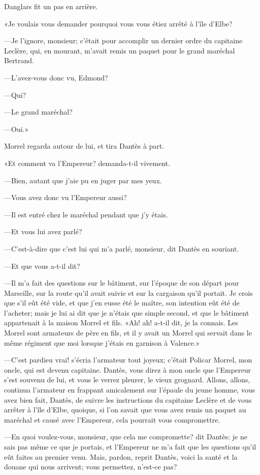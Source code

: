 Danglars fit un pas en arrière.

«Je voulais vous demander pourquoi vous vous étiez arrêté à l'île d'Elbe?

—Je l'ignore, monsieur; c'était pour accomplir un dernier ordre du capitaine Leclère, qui, en mourant, m'avait remis un paquet pour le grand maréchal Bertrand.

—L'avez-vous donc vu, Edmond?

—Qui?

—Le grand maréchal?

—Oui.»

Morrel regarda autour de lui, et tira Dantès à part.

«Et comment va l'Empereur? demanda-t-il vivement.

—Bien, autant que j'aie pu en juger par mes yeux.

—Vous avez donc vu l'Empereur aussi?

—Il est entré chez le maréchal pendant que j'y étais.

—Et vous lui avez parlé?

—C'est-à-dire que c'est lui qui m'a parlé, monsieur, dit Dantès en souriant.

—Et que vous a-t-il dit?

—Il m'a fait des questions sur le bâtiment, sur l'époque de son départ pour Marseille, sur la route qu'il avait suivie et sur la cargaison qu'il portait. Je crois que s'il eût été vide, et que j'en eusse été le maître, son intention eût été de l'acheter; mais je lui ai dit que je n'étais que simple second, et que le bâtiment appartenait à la maison Morrel et fils. «Ah! ah! a-t-il dit, je la connais. Les Morrel sont armateurs de père en fils, et il y avait un Morrel qui servait dans le même régiment que moi lorsque j'étais en garnison à Valence.»

—C'est pardieu vrai! s'écria l'armateur tout joyeux; c'était Policar Morrel, mon oncle, qui est devenu capitaine. Dantès, vous direz à mon oncle que l'Empereur s'est souvenu de lui, et vous le verrez pleurer, le vieux grognard. Allons, allons, continua l'armateur en frappant amicalement sur l'épaule du jeune homme, vous avez bien fait, Dantès, de suivre les instructions du capitaine Leclère et de vous arrêter à l'île d'Elbe, quoique, si l'on savait que vous avez remis un paquet au maréchal et causé avec l'Empereur, cela pourrait vous compromettre.

—En quoi voulez-vous, monsieur, que cela me compromette? dit Dantès: je ne sais pas même ce que je portais, et l'Empereur ne m'a fait que les questions qu'il eût faites au premier venu. Mais, pardon, reprit Dantès, voici la santé et la douane qui nous arrivent; vous permettez, n'est-ce pas?

